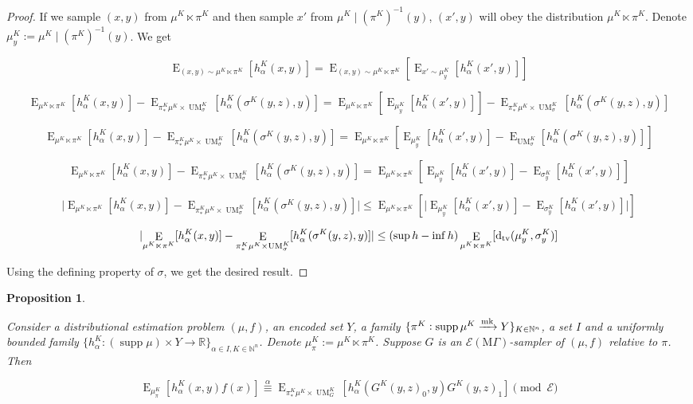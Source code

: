 \documentclass{article}
\numberwithin{equation}{section}
\theoremstyle{definition}
\theoremstyle{plain}
\newtheorem{proposition}{Proposition}[section]
\DeclareMathOperator{\Supp}{supp}
\DeclareMathOperator{\E}{E}
\DeclareMathOperator{\UM}{UM}
\newcommand{\Dtv}{\operatorname{d}_{\textnormal{tv}}}
\newcommand{\Nats}{\mathbb{N}}
\newcommand{\Reals}{\mathbb{R}}
\newcommand{\Abs}[1]{\lvert #1 \rvert}
\newcommand{\MGrow}{\mathrm{M}\Gamma}
\newcommand{\Fall}{\mathcal{E}}
\newcommand{\EMG}{\Fall(\MGrow)}
\newcommand{\Markov}{\xrightarrow{\textnormal{mk}}}
\begin{document}
\begin{proof}

If we sample $(x,y)$ from $\mu^{K} \ltimes \pi^K$ and then sample $x'$ from ${\mu^{K} \mid (\pi^K)^{-1}(y)}$, $(x',y)$ will obey the distribution $\mu^{K} \ltimes \pi^K$. Denote $\mu_y^K:=\mu^{K} \mid (\pi^K)^{-1}(y)$. We get

$$\E_{(x,y) \sim \mu^{K} \ltimes \pi^K}[h_\alpha^K(x,y)] = \E_{(x,y) \sim \mu^{K} \ltimes \pi^K}[\E_{x' \sim \mu_y^K}[h_\alpha^K(x',y)]]$$

$$\E_{\mu^{K} \ltimes \pi^K}[h_\alpha^K(x,y)] - \E_{\pi_*^K\mu^{K} \times \UM_\sigma^K}[h_\alpha^K(\sigma^K(y,z),y)] = \E_{\mu^{K} \ltimes \pi^K}[\E_{\mu_y^K}[h_\alpha^K(x',y)]] - \E_{\pi_*^K\mu^{K} \times \UM_\sigma^K}[h_\alpha^K(\sigma^K(y,z),y)]$$

$$\E_{\mu^{K} \ltimes \pi^K}[h_\alpha^K(x,y)] - \E_{\pi_*^K\mu^{K} \times \UM_\sigma^K}[h_\alpha^K(\sigma^K(y,z),y)] = \E_{\mu^{K} \ltimes \pi^K}[\E_{\mu_y^K}[h_\alpha^K(x',y)]-\E_{\UM_\sigma^K}[h_\alpha^K(\sigma^K(y,z),y)]]$$

$$\E_{\mu^{K} \ltimes \pi^K}[h_\alpha^K(x,y)] - \E_{\pi_*^K\mu^{K} \times \UM_\sigma^K}[h_\alpha^K(\sigma^K(y,z),y)] = \E_{\mu^{K} \ltimes \pi^K}[\E_{\mu_y^K}[h_\alpha^K(x',y)]-\E_{\sigma_y^K}[h_\alpha^K(x',y)]]$$

$$\Abs{\E_{\mu^{K} \ltimes \pi^K}[h_\alpha^K(x,y)] - \E_{\pi_*^K\mu^{K} \times \UM_\sigma^K}[h_\alpha^K(\sigma^K(y,z),y)]} \leq \E_{\mu^{K} \ltimes \pi^K}[\Abs{\E_{\mu_y^K}[h_\alpha^K(x',y)]-\E_{\sigma_y^K}[h_\alpha^K(x',y)]}]$$

$$\Abs{\E_{\mu^{K} \ltimes \pi^K}[h_\alpha^K(x,y)] - \E_{\pi_*^K\mu^{K} \times \UM_\sigma^K}[h_\alpha^K(\sigma^K(y,z),y)]} \leq (\sup h - \inf h) \E_{\mu^{K} \ltimes \pi^K}[\Dtv(\mu_y^K,\sigma_y^K)]$$

Using the defining property of $\sigma$, we get the desired result.
\end{proof}

\begin{proposition}
\label{prp:gen}

Consider a distributional estimation problem $(\mu,f)$, an encoded set $Y$, a family ${\{\pi^K: \Supp \mu^{K} \Markov Y\}_{K \in \Nats^n}}$, a set ${I}$ and a uniformly bounded family ${\{h_\alpha^K: (\Supp \mu) \times Y \rightarrow \Reals\}_{\alpha \in I, K \in \Nats^n}}$. Denote $\mu_\pi^K:=\mu^{K} \ltimes \pi^K$. Suppose $G$ is an $\EMG$-sampler of $(\mu,f)$ relative to $\pi$. Then

\begin{equation}
\E_{\mu_\pi^K}[h_\alpha^K(x,y)f(x)] \overset{\alpha}{\equiv} \E_{\pi_*^K\mu^{K} \times \UM_G^K}[h_\alpha^K(G^K(y,z)_0,y)G^K(y,z)_1] \pmod \Fall
\end{equation}

\end{proposition}
\end{document}
